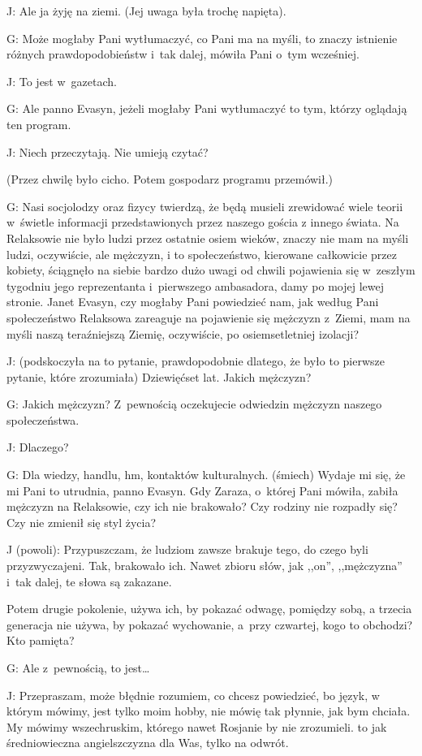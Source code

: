 \documentclass[oneside,polish,12pt,sfheadings]{mwbk}
\begin{document}
J: Ale ja żyję na ziemi. (Jej uwaga była trochę napięta).

G: Może mogłaby Pani wytłumaczyć, co Pani ma na myśli, to znaczy istnienie
różnych prawdopodobieństw i~tak dalej, mówiła Pani o~tym wcześniej.

J: To jest w~gazetach.

G: Ale panno Evasyn, jeżeli mogłaby Pani wytłumaczyć to tym, którzy
oglądają ten program.

J: Niech przeczytają. Nie umieją czytać?

(Przez chwilę było cicho. Potem gospodarz programu przemówił.)

G: Nasi socjolodzy oraz fizycy twierdzą, że będą musieli zrewidować
wiele teorii w~świetle informacji przedstawionych przez naszego gościa
z innego świata. Na Relaksowie nie było ludzi przez ostatnie osiem
wieków, znaczy nie mam na myśli ludzi, oczywiście, ale mężczyzn, i
to społeczeństwo, kierowane całkowicie przez kobiety, ściągnęło na
siebie bardzo dużo uwagi od chwili pojawienia się w~zeszłym tygodniu
jego reprezentanta i~pierwszego ambasadora, damy po mojej lewej stronie.
Janet Evasyn, czy mogłaby Pani powiedzieć nam, jak według Pani społeczeństwo
Relaksowa zareaguje na pojawienie się mężczyzn z~Ziemi, mam na myśli
naszą teraźniejszą Ziemię, oczywiście, po osiemsetletniej izolacji?

J: (podskoczyła na to pytanie, prawdopodobnie dlatego, że było to
pierwsze pytanie, które zrozumiała) Dziewięćset lat. Jakich mężczyzn?

G: Jakich mężczyzn? Z~pewnością oczekujecie odwiedzin mężczyzn naszego
społeczeństwa.

J: Dlaczego?

G: Dla wiedzy, handlu, hm, kontaktów kulturalnych. (śmiech) Wydaje
mi się, że mi Pani to utrudnia, panno Evasyn. Gdy Zaraza, o~której
Pani mówiła, zabiła mężczyzn na Relaksowie, czy ich nie brakowało?
Czy rodziny nie rozpadły się? Czy nie zmienił się styl życia?

J (powoli): Przypuszczam, że ludziom zawsze brakuje tego, do czego
byli przyzwyczajeni. Tak, brakowało ich. Nawet zbioru słów, jak ,,on'', ,,mężczyzna'' i~tak dalej, te słowa są zakazane.

Potem drugie pokolenie, używa ich, by pokazać odwagę, pomiędzy sobą,
a trzecia generacja nie używa, by pokazać wychowanie, a~przy czwartej,
kogo to obchodzi? Kto pamięta?

G: Ale z~pewnością, to jest\ldots

J: Przepraszam, może błędnie rozumiem, co chcesz powiedzieć, bo język,
w którym mówimy, jest tylko moim hobby, nie mówię tak płynnie, jak
bym chciała. My mówimy wszechruskim, którego nawet Rosjanie by nie
zrozumieli. to jak średniowieczna angielszczyzna dla Was, tylko na
odwrót.
\end{document}
